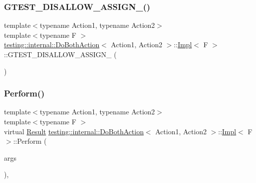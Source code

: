\subsubsection{\texorpdfstring{G\+T\+E\+S\+T\+\_\+\+D\+I\+S\+A\+L\+L\+O\+W\+\_\+\+A\+S\+S\+I\+G\+N\+\_\+()}{GTEST\_DISALLOW\_ASSIGN\_()}}
{\footnotesize\ttfamily template$<$typename Action1, typename Action2$>$ \\
template$<$typename F $>$ \\
\hyperlink{classtesting_1_1internal_1_1DoBothAction}{testing\+::internal\+::\+Do\+Both\+Action}$<$ Action1, Action2 $>$\+::\hyperlink{classtesting_1_1internal_1_1DoBothAction_1_1Impl}{Impl}$<$ F $>$\+::G\+T\+E\+S\+T\+\_\+\+D\+I\+S\+A\+L\+L\+O\+W\+\_\+\+A\+S\+S\+I\+G\+N\+\_\+ (\begin{DoxyParamCaption}\item[{\hyperlink{classtesting_1_1internal_1_1DoBothAction_1_1Impl}{Impl}$<$ F $>$}]{ }\end{DoxyParamCaption})\hspace{0.3cm}{\ttfamily [private]}}

\mbox{\label{classtesting_1_1internal_1_1DoBothAction_1_1Impl_aa8f102e1918e64266ddb9b00db2c4b5e}} 
\subsubsection{\texorpdfstring{Perform()}{Perform()}}
{\footnotesize\ttfamily template$<$typename Action1, typename Action2$>$ \\
template$<$typename F $>$ \\
virtual \hyperlink{classtesting_1_1ActionInterface_a7477de2fe3e4e01c59db698203acaee7}{Result} \hyperlink{classtesting_1_1internal_1_1DoBothAction}{testing\+::internal\+::\+Do\+Both\+Action}$<$ Action1, Action2 $>$\+::\hyperlink{classtesting_1_1internal_1_1DoBothAction_1_1Impl}{Impl}$<$ F $>$\+::Perform (\begin{DoxyParamCaption}\item[{const \hyperlink{classtesting_1_1ActionInterface_af72720d864da4d606629e83edc003511}{Argument\+Tuple} \&}]{args }\end{DoxyParamCaption})\hspace{0.3cm}{\ttfamily [inline]}, {\ttfamily [virtual]}}




